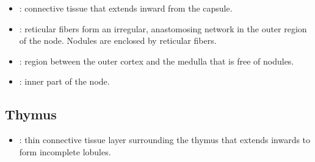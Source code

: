 \begin{itemize}
\begin{multicols}{2}
\begin{itemize}
    \begin{center}
    \end{center}
    
    \item {}: connective tissue that extends inward from the capsule.
    
    \begin{center}
    \end{center}

    \item {}: reticular fibers form an irregular, anastomosing network in the outer region of the node. Nodules are enclosed by reticular fibers.
    
    \begin{center}
    \end{center}

    \item {}: region between the outer cortex and the medulla that is free of nodules. 
    
    \begin{center}
    \end{center}
    
    \item {}: inner part of the node. 
    
    \begin{center}
    \end{center}
  \end{itemize}
\end{multicols}

  \subsection{Thymus}\label{Thymus}
  \begin{multicols}{2}
  \begin{itemize}
    \item {}: thin connective tissue layer surrounding the thymus that extends inwards to form incomplete lobules.
    

\end{itemize}
\end{multicols}
\end{itemize}
